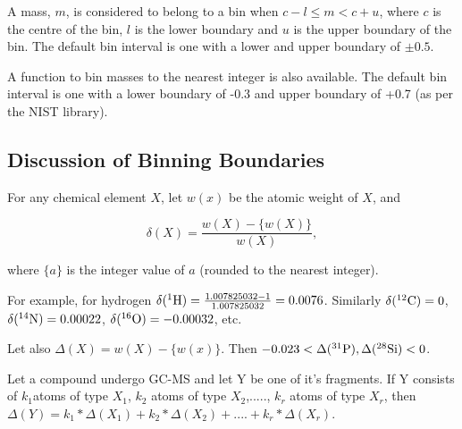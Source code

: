 A mass, $m$, is considered to belong to a bin when $c - l \le m < c + u$,
where $c$ is the centre of the bin, $l$ is the lower boundary and $u$ is
the upper boundary of the bin. The default bin interval is one with a lower
and upper boundary of $\pm0.5$.

A function to bin masses to the nearest integer is also available. The default
bin interval is one with a lower boundary of -0.3 and upper boundary of +0.7 (as
per the NIST library).



\subsection{Discussion of Binning Boundaries}

For any chemical element $X$, let $w(x)$ be the atomic weight of $X$, and

\begin{equation}
\delta(X) = \frac{w(X) - \{w(X)\}}{w(X)}, 
\end{equation}

where $\{a\}$ is the integer value of $a$ (rounded to the nearest integer).

For example, for hydrogen $\delta(^1\rm{H}) = \frac{1.007825032 - 1}{1.007825032} = 
0.0076$. Similarly $\delta(^{12}\rm{C}) = 0$, $ \delta(^{14}\rm{N}) = 0.00022$,
$\delta(^{16}\rm{O}) = -0.00032$, etc.

Let also $\Delta(X) = w(X) - \{w(x)\}$. Then $-0.023 <\Delta(^{31}\rm{P}),
\Delta(^{28}\rm{Si}) < 0$.

Let a compound undergo GC-MS and let Y be one of it's fragments. If Y consists 
of $k_{1}$atoms of type $X_{1}$, 
$k_{2}$ atoms of type $X_{2}$,....., 
$k_{r}$ atoms of type $X_{r}$, then
$\Delta(Y) = k_{1}*\Delta(X_{1}) + k_{2}*\Delta(X_{2}) + ....+ k_{r}*
\Delta(X_{r})$.

